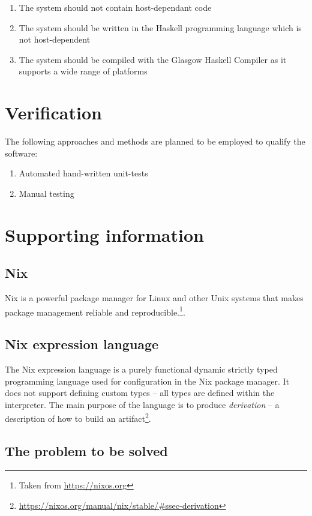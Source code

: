 \documentclass[12pt]{article}
\begin{document}
\begin{enumerate}
  \item The system should not contain host-dependant code
  \item The system should be written in the Haskell programming language which is not host-dependent
  \item The system should be compiled with the Glasgow Haskell Compiler as it supports a wide range of platforms
\end{enumerate}

\section{Verification}

The following approaches and methods are planned to be employed to qualify the software:

\begin{enumerate}
  \item Automated hand-written unit-tests
  \item Manual testing
\end{enumerate}

\section{Supporting information}

\subsection{Nix}

Nix is a powerful package manager for Linux and other Unix systems that makes package management reliable and reproducible.\footnote{Taken from \url{https://nixos.org}}.

\subsection{Nix expression language}

The Nix expression language is a purely functional dynamic strictly typed programming language used for configuration in the Nix package manager. It does not support defining custom types – all types are defined within the interpreter. The main purpose of the language is to produce \emph{derivation} – a description of how to build an artifact\footnote{\url{https://nixos.org/manual/nix/stable/\#ssec-derivation}}.

\subsection{The problem to be solved}
\end{document}
